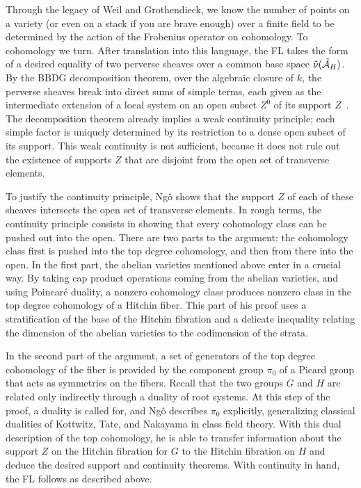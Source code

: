 Through the legacy of Weil and Grothendieck, we know the number of
points on a variety (or even on a stack if you are brave enough) over
a finite field to be determined by the action of the Frobenius operator on
cohomology.  To cohomology we turn.  After translation into this
language, the FL takes the form of a desired equality of two perverse
sheaves over a common base space $\tilde\nu(\tilde\AA_H)$.  By the
BBDG decomposition theorem, over the algebraic closure of $k$, the
perverse sheaves break into  direct sums of simple terms, each given
as the intermediate extension of a local system on an open subset
$Z^0$ of its support $Z$~\cite{BBDG:1982}.  The decomposition theorem
already implies a weak continuity principle; each simple factor is
uniquely determined by its restriction to a dense open subset of its
support.  This weak continuity is not sufficient, because it does not
rule out the existence of supports $Z$ that are disjoint from the open
set of transverse elements.

To justify the continuity principle, Ng\^o shows that the support $Z$
of each of these sheaves intersects the open set of transverse
elements.  In rough terms, the continuity principle consists in
showing that every cohomology class can be pushed out into the open.
There are two parts to the argument: the cohomology class first is
pushed into the top degree cohomology, and then from there into the
open.  In the first part, the abelian varieties mentioned above enter
in a crucial way.  By taking cap product operations coming from the
abelian varieties, and using Poincar\'e duality, a nonzero cohomology
class produces nonzero class in the top degree cohomology of a Hitchin
fiber.  This part of his proof uses a stratification of the base of
the Hitchin fibration and a delicate inequality relating the dimension
of the abelian varieties to the codimension of the strata.

In the second part of the argument, a set of generators of the top
degree cohomology of the fiber is provided by the component group
$\pi_0$ of a Picard group that acts as symmetries on the fibers.
Recall that the two groups $G$ and $H$ are related only indirectly
through a duality of root systems.  At this step of the proof, a
duality is called for, and Ng\^o describes $\pi_0$ explicitly,
generalizing classical dualities of Kottwitz, Tate, and Nakayama in
class field theory.  With this dual description of the top cohomology,
he is able to transfer information about the support $Z$ on the
Hitchin fibration for $G$ to the Hitchin fibration on $H$ and deduce
the desired support and continuity theorems.  With continuity in hand,
the FL follows as described above.

